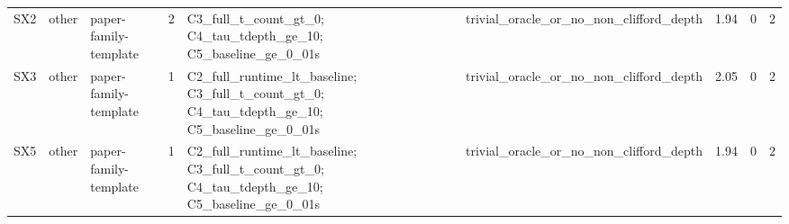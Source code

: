 \begin{tabular}{lllrlllll}
SX2 & other & paper-family-template & 2 & C3\_full\_t\_count\_gt\_0; C4\_tau\_tdepth\_ge\_10; C5\_baseline\_ge\_0\_01s & trivial\_oracle\_or\_no\_non\_clifford\_depth & 1.94 & 0 & 2 \\
SX3 & other & paper-family-template & 1 & C2\_full\_runtime\_lt\_baseline; C3\_full\_t\_count\_gt\_0; C4\_tau\_tdepth\_ge\_10; C5\_baseline\_ge\_0\_01s & trivial\_oracle\_or\_no\_non\_clifford\_depth & 2.05 & 0 & 2 \\
SX5 & other & paper-family-template & 1 & C2\_full\_runtime\_lt\_baseline; C3\_full\_t\_count\_gt\_0; C4\_tau\_tdepth\_ge\_10; C5\_baseline\_ge\_0\_01s & trivial\_oracle\_or\_no\_non\_clifford\_depth & 1.94 & 0 & 2 \\
\bottomrule
\end{tabular}
